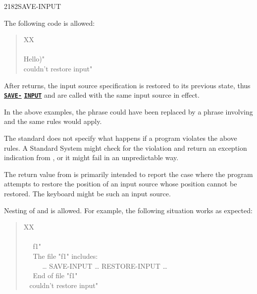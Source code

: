\begin{worddef}{2182}{SAVE-INPUT}
\begin{rationale}
		The following code is allowed:

		\begin{quote}\ttfamily
			\word{:} XX \\
			\tab {} ~  \\
			\tab {}  Hello)"  \\
			\tab {}  couldn't restore input" \\
			\word{;}
		\end{quote}

		After  returns, the input source specification
		is restored to its previous state, thus
		\hyperref{}{core}{SAVE-INPUT}{\textbf{\texttt{SAVE-}}}
		\hyperref{}{core}{SAVE-INPUT}{\textbf{\texttt{INPUT}}}
		and  are called with the same input source
		in effect.

		In the above examples, the  phrase could have
		been replaced by a phrase involving 
		and the same rules would apply.

		The standard does not specify what happens if a program
		violates the above rules. A Standard System might check for
		the violation and return an exception indication from
		, or it might fail in an unpredictable
		way.

		The return value from  is primarily
		intended to report the case where the program attempts to
		restore the position of an input source whose position cannot
		be restored. The keyboard might be such an input source.

		Nesting of  and  is
		allowed. For example, the following situation works as
		expected:

		\begin{quote}\ttfamily
			\word{:} XX \\
			\tab {} \\
			\tab~~  f1"  \\
			\tab~~  The file "f1" includes: \\
			\tab~~  ~~ {\ldots} SAVE-INPUT {\ldots} RESTORE-INPUT {\ldots} \\
			\tab~~  End of file "f1" \\
			\tab {} ~  couldn't restore input" \\
			\word{;}
		\end{quote}


\end{rationale}
\end{worddef}
